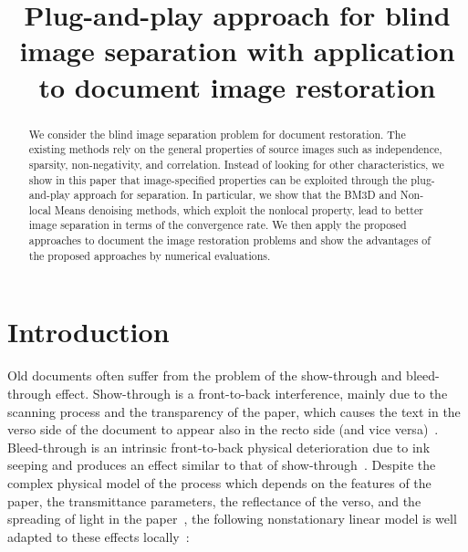 \documentclass[conference]{IEEEtran}
\theoremstyle{plain}
\begin{document}
\title{Plug-and-play approach for blind image separation with application to document image restoration}

\author{
}	

\maketitle

\begin{abstract}
We consider the blind image separation problem for document restoration. The existing methods rely on the general properties of source images such as independence, sparsity, non-negativity, and correlation. Instead of looking for other characteristics, we show in this paper that image-specified properties can be exploited through the plug-and-play approach for separation. In particular, we show that the BM3D and Non-local Means denoising methods, which exploit the nonlocal property, lead to better image separation in terms of the convergence rate. We then apply the proposed approaches to document the image restoration problems and show the advantages of the proposed approaches by numerical evaluations. 
\end{abstract}


\section{Introduction}
Old documents often suffer from the problem of the show-through and bleed-through effect. Show-through is a front-to-back interference, mainly due to the scanning process and the transparency of the paper, which
causes the text in the verso side of the document to appear also in the recto side (and vice versa)~\cite{sharma2001show}. Bleed-through is an intrinsic front-to-back physical deterioration due to ink seeping and produces an effect similar to that of show-through~\cite{boccuto2019blind}. Despite the complex physical model of the process which depends on the features of the paper, the transmittance parameters, the reflectance of the verso, and the spreading of light in the paper~\cite{tonazzini2015non,martinelli2012nonlinear,moghaddam2009low,almeida2008wavelet}, the following nonstationary linear model is well adapted to these effects locally~\cite{boccuto2019blind}:
\end{document}
